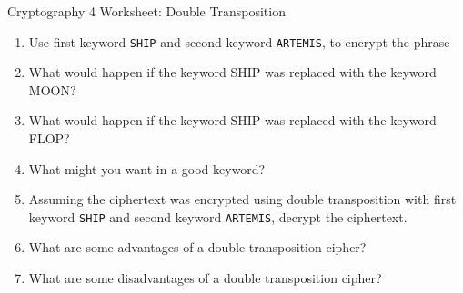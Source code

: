 \documentclass[12pt]{article}
\newcommand{\be}{\begin{enumerate}}
\newcommand{\ee}{\end{enumerate}}
\begin{document}
\begin{center}
{\Large  Cryptography 4 Worksheet: Double Transposition}
\end{center}
%
%
%


\be
\item Use first keyword {\tt SHIP} and second keyword {\tt ARTEMIS}, to encrypt the phrase 

%

\vfill

\vfill

\vfill

\item What would happen if the keyword SHIP was replaced with the keyword MOON?
\vfill
\item What would happen if the keyword SHIP was replaced with the keyword FLOP?
\vfill
\item What might you want in a good keyword?
\vfill
\newpage
\item 
Assuming the ciphertext was encrypted using double transposition with first keyword {\tt SHIP} and second keyword {\tt ARTEMIS}, decrypt the ciphertext.



\vfill

\vfill


\item What are some advantages of a double transposition cipher?

\vfill

\item What are some disadvantages of a double transposition cipher?

\vfill
\ee

%
%
%

\vfill

\vfill

\vfill

\end{document}
